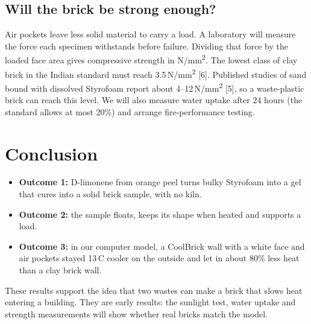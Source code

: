 \documentclass[11pt,a4paper]{article}
\begin{document}
\subsection{Will the brick be strong enough?}
Air pockets leave less solid material to carry a load. A laboratory will
measure the force each specimen withstands before failure. Dividing that force
by the loaded face area gives compressive strength in N/mm\textsuperscript{2}.
The lowest class of clay brick in the Indian standard must reach 3.5\,N/mm\textsuperscript{2}
[6]. Published studies of sand bound with dissolved Styrofoam report about
4--12\,N/mm\textsuperscript{2} [5], so a waste-plastic brick can reach this level.
We will also measure water uptake after 24 hours (the standard allows at most
20\%) and arrange fire-performance testing.

\section{Conclusion}
\begin{itemize}[leftmargin=*,itemsep=3pt]
  \item \textbf{Outcome 1:} D-limonene from orange peel turns bulky Styrofoam
        into a gel that cures into a solid brick sample, with no kiln.
  \item \textbf{Outcome 2:} the sample floats, keeps its shape when heated and
        supports a load.
  \item \textbf{Outcome 3:} in our computer model, a CoolBrick wall with a white
        face and air pockets stayed 13\,\textdegree C cooler on the outside and let in
        about 80\% less heat than a clay brick wall.
\end{itemize}
These results support the idea that two wastes can make a brick that slows
heat entering a building. They are early results: the sunlight test, water
uptake and strength measurements will show whether real bricks match the model.

\end{document}
